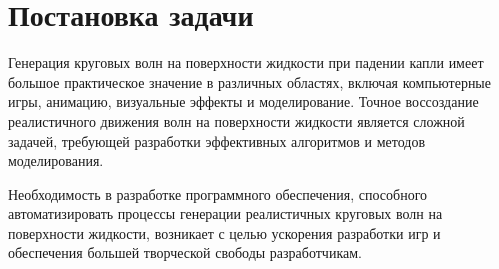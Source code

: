 \chapter{Постановка задачи}

Генерация круговых волн на поверхности жидкости при падении капли имеет большое практическое
значение в различных областях, включая компьютерные игры, анимацию, визуальные эффекты и моделирование. 
Точное воссоздание реалистичного движения волн на поверхности жидкости является сложной задачей, 
требующей разработки эффективных алгоритмов и методов моделирования.

Необходимость в разработке программного обеспечения, способного автоматизировать процессы 
генерации реалистичных круговых волн на поверхности жидкости, возникает с целью ускорения 
разработки игр и обеспечения большей творческой свободы разработчикам.